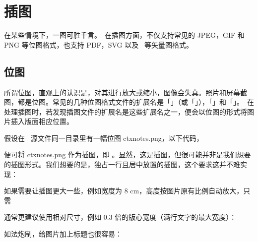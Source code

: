 \chapter{插图}

在某些情境下，一图可胜千言。\ConTeXt\ 在插图方面，不仅支持常见的 JPEG，GIF 和 PNG 等位图格式，也支持 PDF，SVG 以及 \MetaPost\ 等矢量图格式。

\section[figure]{位图}

所谓位图，直观上的认识是，对其进行放大或缩小，图像会失真。照片和屏幕截图，都是位图。常见的几种位图格式文件的扩展名是「」（或「」），「」和「」。\ConTeXt\ 在处理插图时，若发现插图文件的扩展名是这些扩展名之一，便会以位图的形式将图片插入版面相应位置。

假设在 \ConTeXt\ 源文件同一目录里有一幅位图 ctxnotes.png，以下代码，

\starttyping[option=TEX]
\stoptyping


\noindent 便可将 ctxnotes.png 作为插图，即 。显然，这是插图，但很可能并非是我们想要的插图形式。我们想要的是，独占一行且居中放置的插图，这个要求这并不难实现：

\starttyping[option=TEX]
\stoptyping


如果需要让插图更大一些，例如宽度为 8 cm，高度按图片原有比例自动放大，只需

\starttyping[option=TEX]
\stoptyping

\noindent 通常更建议使用相对尺寸，例如 0.3 倍的版心宽度（满行文字的最大宽度）：

\starttyping[option=TEX]
\stoptyping


如法炮制，给图片加上标题也很容易：

\starttyping[option=TEX]
\stoptyping



